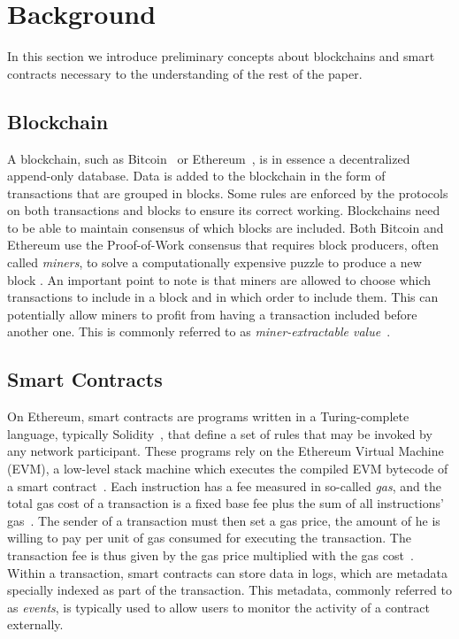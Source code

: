 \section{Background}
\label{sec:background}
In this section we introduce preliminary concepts about blockchains and smart contracts necessary to the understanding of the rest of the paper.

\subsection{Blockchain}

A blockchain, such as Bitcoin~\cite{Nakamoto} or Ethereum~\cite{wood2014ethereum}, is in essence a decentralized append-only database.
Data is added to the blockchain in the form of transactions that are grouped in blocks.
Some rules are enforced by the protocols on both transactions and blocks to ensure its correct working.
Blockchains need to be able to maintain consensus of which blocks are included.
Both Bitcoin and Ethereum use the Proof-of-Work consensus that requires block producers, often called \emph{miners}, to solve a computationally expensive puzzle to produce a new block \cite{Perez2020c}.
An important point to note is that miners are allowed to choose which transactions to include in a block and in which order to include them.
This can potentially allow miners to profit from having a transaction included before another one.
This is commonly referred to as \emph{miner-extractable value}~\cite{daian2020flash}.

\subsection{Smart Contracts}
On Ethereum, smart contracts are programs written in a Turing-complete language, typically Solidity~\cite{docs:solidity}, that define a set of rules that may be invoked by any network participant. 
These programs rely on the Ethereum Virtual Machine (EVM), a low-level stack machine which executes the compiled EVM bytecode of a smart contract~\cite{wood2014ethereum}.
Each instruction has a fee measured in so-called \textit{gas}, and the total gas cost of a transaction is a fixed base fee plus the sum of all instructions' gas~\cite{albert2020gasol,Perez2020f}.
The sender of a transaction must then set a gas price, the amount of  he is willing to pay per unit of gas consumed for executing the transaction.
The transaction fee is thus given by the gas price multiplied with the gas cost~\cite{werner2020step,pierro2019influence}.
Within a transaction, smart contracts can store data in logs, which are metadata specially indexed as part of the transaction.
This metadata, commonly referred to as \textit{events}, is typically used to allow users to monitor the activity of a contract externally.

